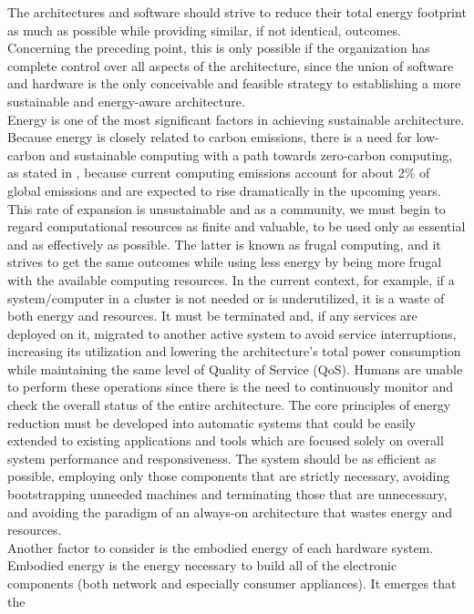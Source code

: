 The architectures and software should strive to reduce their total energy
footprint as much as possible while providing similar, if not identical,
outcomes. Concerning the preceding point, this is only possible if the
organization has complete control over all aspects of the architecture, since the
union of software and hardware is the only conceivable and feasible strategy to establishing
a more sustainable and energy-aware architecture. \\ %
Energy is one of the most significant factors in achieving sustainable architecture.
Because energy is closely related to carbon emissions, there is a need for low-carbon
and sustainable computing with a path towards zero-carbon computing, as stated
in \cite{frugal_computing}, because current computing emissions account for about
2\% of global emissions and are expected to rise dramatically in the upcoming
years. This rate of expansion is unsustainable and as a community, we must begin
to regard computational resources as finite and valuable, to be used only as essential
and as effectively as possible. The latter is known as frugal computing, and it strives
to get the same outcomes while using less energy by being more frugal with the available
computing resources. In the current context, for example, if a system/computer
in a cluster is not needed or is underutilized, it is a waste of both energy and
resources. It must be terminated and, if any services are deployed on it,
migrated to another active system to avoid service interruptions, increasing its
utilization and lowering the architecture's total power consumption while maintaining
the same level of Quality of Service (QoS). Humans are unable to perform these
operations since there is the need to continuously monitor and check the overall
status of the entire architecture. The core principles of energy reduction must be
developed into automatic systems that could be easily extended to existing applications
and tools which are focused solely on overall system performance and responsiveness.
The system should be as efficient as possible, employing only those components that
are strictly necessary, avoiding bootstrapping unneeded machines and terminating
those that are unnecessary, and avoiding the paradigm of an always-on architecture
that wastes energy and resources. \\ %
Another factor to consider is the embodied energy of each hardware system.
Embodied energy is the energy necessary to build all of the electronic
components (both network and especially consumer appliances). It emerges that the
